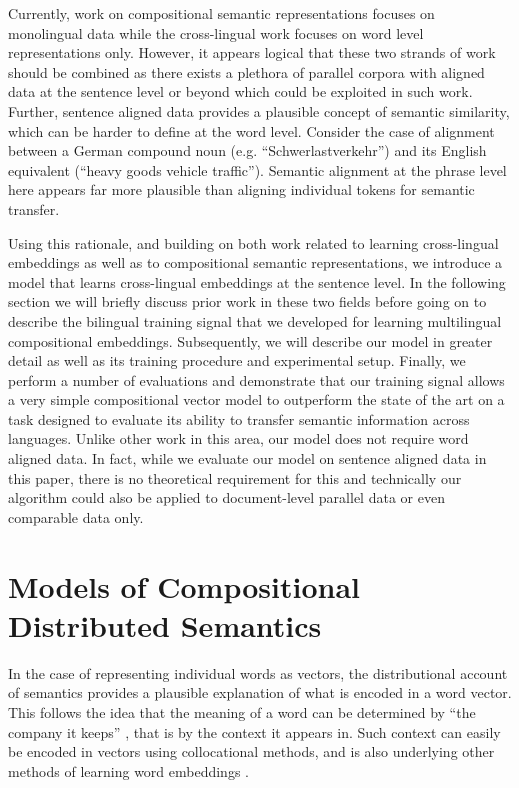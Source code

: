 \documentclass{article} \pdfoutput=1
\begin{document}
Currently, work on compositional semantic representations focuses on monolingual data while the cross-lingual work focuses on word level representations only.
However, it appears logical that these two strands of work should be combined as there exists a plethora of parallel corpora with aligned data at the sentence level or beyond which could be exploited in such work.
Further, sentence aligned data provides a plausible concept of semantic similarity, which can be harder to define at the word level.
Consider the case of alignment between a German compound noun (e.g. ``Schwerlastverkehr'') and its English equivalent (``heavy goods vehicle traffic''). 
Semantic alignment at the phrase level here appears far more plausible than aligning individual tokens for semantic transfer.

Using this rationale, and building on both work related to learning cross-lingual embeddings as well as to compositional semantic representations, we introduce a model that learns cross-lingual embeddings at the sentence level.
In the following section we will briefly discuss prior work in these two fields before going on to describe the bilingual training signal that we developed for learning multilingual compositional embeddings.
Subsequently, we will describe our model in greater detail as well as its training procedure and experimental setup.
Finally, we perform a number of evaluations and demonstrate that our training signal allows a very simple compositional vector model to outperform the state of the art on a task designed to evaluate its ability to transfer semantic information across languages.
Unlike other work in this area, our model does not require word aligned data.
In fact, while we evaluate our model on sentence aligned data in this paper, there is no theoretical requirement for this and technically our algorithm could also be applied to document-level parallel data or even comparable data only. \section{Models of Compositional Distributed Semantics}

In the case of representing individual words as vectors, the distributional
account of semantics provides a plausible explanation of what is encoded in a
word vector.  This follows the idea that the meaning of a word can be determined
by ``the company it keeps'' \cite{Firth:1957}, that is by the context it appears
in.  Such context can easily be encoded in vectors using collocational methods,
and is also underlying other methods of learning word embeddings
\cite{Collobert:2008,Mikolov:2010}.
\end{document}
